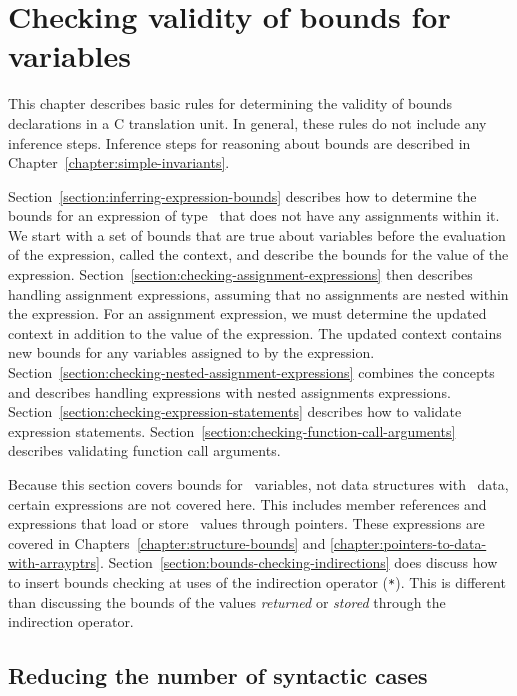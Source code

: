 
\chapter{Checking validity of bounds for variables}
\label{chapter:checking-bounds}

This chapter describes basic rules for determining the validity of
bounds declarations in a C translation unit. In general, these rules do
not include any inference steps. Inference steps for reasoning about
bounds are described in Chapter~\ref{chapter:simple-invariants}.

Section~\ref{section:inferring-expression-bounds}
describes how to determine the bounds for an expression of
type \arrayptr\ that does not have any assignments within it.
We start with a set of bounds that are true about variables before the
evaluation of the expression, called the context, and describe the
bounds for the value of the expression.
Section~\ref{section:checking-assignment-expressions}
then describes handling assignment expressions, assuming
that no assignments are nested within the expression. For an assignment
expression, we must determine the updated context in addition to the
value of the expression. The updated context contains new bounds for any
variables assigned to by the expression.
Section~\ref{section:checking-nested-assignment-expressions}
combines the concepts and describes handling expressions
with nested assignments expressions.
Section~\ref{section:checking-expression-statements} 
describes how to validate expression statements. 
Section~\ref{section:checking-function-call-arguments}
describes validating function call arguments.

Because this section covers bounds for \arrayptr\ variables,
not data structures with \arrayptr\ data, certain expressions
are not covered here. This includes member references and expressions
that load or store \arrayptr\ values through pointers. These
expressions are covered in Chapters~\ref{chapter:structure-bounds} and
\ref{chapter:pointers-to-data-with-arrayptrs}.
Section~\ref{section:bounds-checking-indirections} does discuss how to 
insert bounds checking at uses of the
indirection operator (\texttt{*}). This is different than discussing the
bounds of the values \emph{returned} or \emph{stored} through the
indirection operator.

\section{Reducing the number of syntactic cases}

